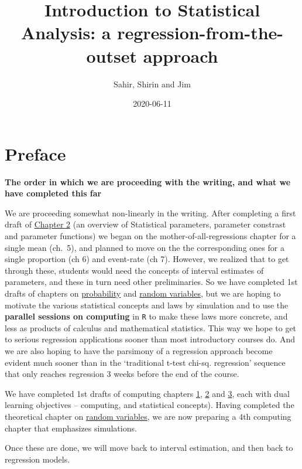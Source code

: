 \documentclass[]{book}
\title{Introduction to Statistical Analysis: a regression-from-the-outset approach}
\author{Sahir, Shirin and Jim}
\date{2020-06-11}
\begin{document}
\maketitle

{
\setcounter{tocdepth}{1}
\tableofcontents
}
\hypertarget{preface}{%
\chapter*{Preface}\label{preface}}

\textbf{The order in which we are proceeding with the writing, and what we have completed this far}

We are proceeding somewhat non-linearly in the writing. After completing a first draft of \protect\hyperlink{paras}{Chapter 2} (an overview of Statistical parameters, parameter constrast and parameter functions) we began on the mother-of-all-regressions chapter for a single mean (ch.~5), and planned to move on the the corresponding ones for a single proportion (ch 6) and event-rate (ch 7). However, we realized that to get through these, students would need the concepts of interval estimates of parameters, and these in turn need other preliminaries. So we have completed 1st drafts of chapters on \protect\hyperlink{probability}{probability} and \protect\hyperlink{randomVariables}{random variables}, but we are hoping to motivate the various statistical concepts and laws by simulation and to use the \textbf{parallel sessions on computing} in \texttt{R} to make these laws more concrete, and less as products of calculus and mathematical statistics. This way we hope to get to serious regression applications sooner than most introductory courses do. And we are also hoping to have the parsimony of a regression approach become evident much sooner than in the `traditional t-test chi-sq. regression' sequence that only reaches regression 3 weeks before the end of the course.

We have completed 1st drafts of computing chapters \protect\hyperlink{computing01}{1}, \protect\hyperlink{computing02}{2} and \protect\hyperlink{computing03}{3}, each with dual learning objectives -- computing, and statistical concepts). Having completed the theoretical chapter on \protect\hyperlink{randomVariables}{random variables}, we are now preparing a 4th computing chapter that emphasizes simulations.

Once these are done, we will move back to interval estimation, and then back to regression models.
\end{document}
